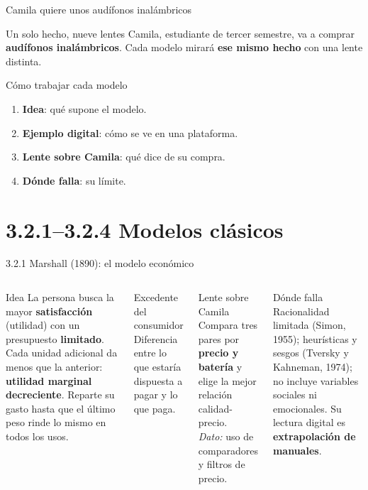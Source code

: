 \documentclass[aspectratio=169,xcolor=dvipsnames]{beamer}
\begin{document}
\begin{frame}{Camila quiere unos audífonos inalámbricos}
\begin{exampleblock}{Un solo hecho, nueve lentes}
  \small Camila, estudiante de tercer semestre, va a comprar \textbf{audífonos inalámbricos}. Cada modelo mirará \textbf{ese mismo hecho} con una lente distinta.
\end{exampleblock}
\begin{block}{Cómo trabajar cada modelo}
  \small
  \begin{enumerate}
    \item \textbf{Idea}: qué supone el modelo.
    \item \textbf{Ejemplo digital}: cómo se ve en una plataforma.
    \item \textbf{Lente sobre Camila}: qué dice de su compra.
    \item \textbf{Dónde falla}: su límite.
  \end{enumerate}
\end{block}
\end{frame}

\section[Clásicos]{3.2.1--3.2.4 Modelos clásicos}

\begin{frame}{3.2.1 Marshall (1890): el modelo económico}
\begin{columns}[T]
  \begin{block}{Idea}
    \small La persona busca la mayor \textbf{satisfacción} (utilidad) con un presupuesto \textbf{limitado}. Cada unidad adicional da menos que la anterior: \textbf{utilidad marginal decreciente}. Reparte su gasto hasta que el último peso rinde lo mismo en todos los usos.
  \end{block}
  \begin{exampleblock}{Excedente del consumidor}
    \small Diferencia entre lo que estaría dispuesta a pagar y lo que paga.
  \end{exampleblock}
  \begin{alertblock}{Lente sobre Camila}
    \small Compara tres pares por \textbf{precio y batería} y elige la mejor relación calidad-precio.\\
    \textit{Dato:} uso de comparadores y filtros de precio.
  \end{alertblock}
  \begin{block}{Dónde falla}
    \footnotesize Racionalidad limitada (Simon, 1955); heurísticas y sesgos (Tversky y Kahneman, 1974); no incluye variables sociales ni emocionales. Su lectura digital es \textbf{extrapolación de manuales}.
  \end{block}
\end{columns}
\end{frame}
\end{document}
